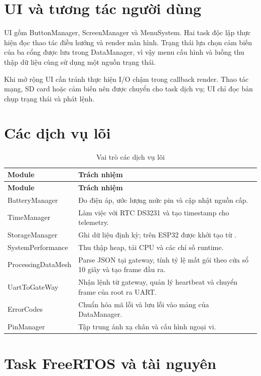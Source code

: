 \documentclass[a4paper]{article}
\newcommand{\codeword}[1]{\texttt{\detokenize{#1}}}
\begin{document}
\section{UI và tương tác người dùng}

UI gồm ButtonManager, ScreenManager và MenuSystem. Hai task độc lập thực hiện
đọc thao tác điều hướng và render màn hình. Trạng thái lựa chọn cảm biến của
ba cổng được lưu trong DataManager, vì vậy menu cấu hình và luồng thu thập dữ
liệu cùng sử dụng một nguồn trạng thái.

Khi mở rộng UI cần tránh thực hiện I/O chậm trong callback render. Thao tác
mạng, SD card hoặc cảm biến nên được chuyển cho task dịch vụ; UI chỉ đọc bản
chụp trạng thái và phát lệnh.

\section{Các dịch vụ lõi}

\begin{longtable}{p{4.2cm}p{10cm}}
  \caption{Vai trò các dịch vụ lõi}\\
  \toprule
  \textbf{Module} & \textbf{Trách nhiệm} \\
  \midrule
  \endfirsthead
  \toprule
  \textbf{Module} & \textbf{Trách nhiệm} \\
  \midrule
  \endhead
  BatteryManager & Đo điện áp, ước lượng mức pin và cập nhật nguồn cấp. \\
  TimeManager & Làm việc với RTC DS3231 và tạo timestamp cho telemetry. \\
  StorageManager & Ghi dữ liệu định kỳ; trên ESP32 được khởi tạo từ
  \codeword{app_main()}. \\
  SystemPerformance & Thu thập heap, tải CPU và các chỉ số runtime. \\
  ProcessingDataMesh & Parse JSON tại gateway, tính tỷ lệ mất gói theo cửa sổ
  10 giây và tạo frame đầu ra. \\
  UartToGateWay & Nhận lệnh từ gateway, quản lý heartbeat và chuyển frame của
  root ra UART. \\
  ErrorCodes & Chuẩn hóa mã lỗi và lưu lỗi vào mảng của DataManager. \\
  PinManager & Tập trung ánh xạ chân và cấu hình ngoại vi. \\
  \bottomrule
\end{longtable}

\section{Task FreeRTOS và tài nguyên}
\end{document}
